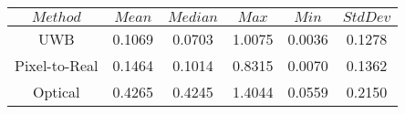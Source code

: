 \begin{table}[h]
\centering
\begin{tabular}{|c|c|c|c|c|c|}
\hline
$Method$ & $Mean$ & $Median$ & $Max$ & $Min$ & $StdDev$ \\
\hline
UWB & 0.1069 & 0.0703 & 1.0075 & 0.0036 & 0.1278 \\
\hline
Pixel-to-Real & 0.1464 & 0.1014 & 0.8315 & 0.0070 & 0.1362 \\
\hline
Optical & 0.4265 & 0.4245 & 1.4044 & 0.0559 & 0.2150 \\
\hline
\end{tabular}
\end{table}
